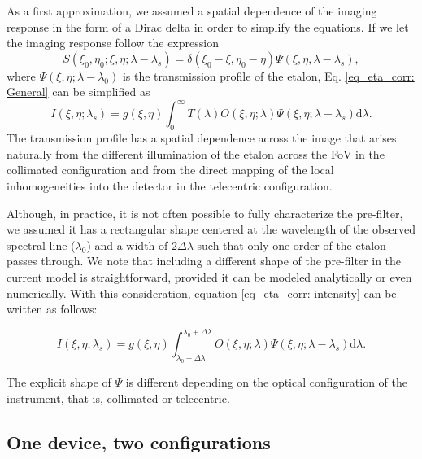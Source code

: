 As a first approximation, we assumed a spatial dependence of the imaging response in the form of a Dirac delta in order to simplify the equations. If we let the imaging response follow the expression 
\begin{equation}
S\left(\xi_0, \eta_0; \xi , \eta; \lambda-\lambda_{s}\right)=\delta(\xi_0-\xi,\eta_0-\eta)\Psi(\xi,\eta,\lambda-\lambda_s),
\end{equation}
where $\Psi\left(\xi, \eta ; \lambda-\lambda_{0}\right) $ is the transmission profile of the etalon, Eq. \eqref{eq_eta_corr: General} can be simplified as
\begin{equation}
    I\left(\xi, \eta ; \lambda_{s}\right)=g(\xi, \eta)\int_{0}^{\infty} T(\lambda)  O\left(\xi, \eta ; \lambda\right) \Psi\left(\xi, \eta ; \lambda-\lambda_{s}\right)  \mathrm{d} \lambda.
    \label{eq_eta_corr: intensity}
\end{equation}
The transmission profile has a spatial dependence across the image that arises naturally from the different illumination of the etalon across the FoV in the collimated configuration and from the direct mapping of the local inhomogeneities into the detector in the telecentric configuration. 

Although, in practice, it is not often possible to fully characterize the pre-filter, we assumed it has a rectangular shape centered at the wavelength of the observed spectral line ($\lambda _ {0}$) and a width of $2\Delta \lambda$ such that only one order of the etalon passes through. We note that including a different shape of the pre-filter in the current model is straightforward, provided it can be modeled analytically or even numerically. With this consideration, equation \eqref{eq_eta_corr: intensity} can be written as follows:

\begin{equation}
    I(\xi, \eta ; \lambda_{s})=g(\xi, \eta)\int_{\lambda _{0} - \Delta \lambda}^{\lambda _ {0} + \Delta \lambda}  O(\xi, \eta ; \lambda)  \Psi(\xi, \eta ; \lambda-\lambda_{s})  \mathrm{d} \lambda .
    \label{eq_eta_corr: Intensity-final}
\end{equation}

The explicit shape of $\Psi$  is different depending on the optical configuration of the instrument, that is, collimated or telecentric.
\subsection{One device, two configurations}

